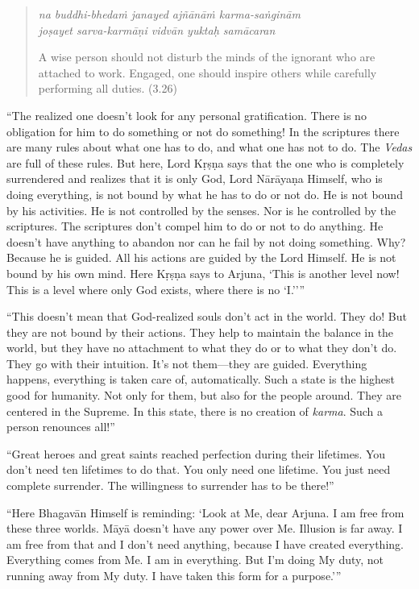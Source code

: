 \documentclass[12pt, twoside, openright]{memoir}
\begin{document}
\par
\begin{verse}
\textit{na buddhi-bhedaṁ janayed ajñānāṁ karma-saṅginām} \\
\textit{joṣayet sarva-karmāṇi vidvān yuktaḥ samācaran}

\noindent A wise person should not disturb the minds of the ignorant who are attached to work. Engaged, one should inspire others while carefully performing all duties. (3.26)
\end{verse}
\par


\enquote{The realized one doesn’t look for any personal gratification. There is no obligation for him to do something or not do something! In the scriptures there are many rules about what one has to do, and what one has not to do. The \textit{Vedas} are full of these rules. But here, Lord Kṛṣṇa says that the one who is completely surrendered and realizes that it is only God, Lord Nārāyaṇa Himself, who is doing everything, is not bound by what he has to do or not do. He is not bound by his activities. He is not controlled by the senses. Nor is he controlled by the scriptures. The scriptures don’t compel him to do or not to do anything. He doesn’t have anything to abandon nor can he fail by not doing something. Why? Because he is guided. All his actions are guided by the Lord Himself. He is not bound by his own mind. Here Kṛṣṇa says to Arjuna, \enquote{This is another level now! This is a level where only God exists, where there is no ‘I.’}}

\enquote{This doesn’t mean that God-realized souls don’t act in the world. They do! But they are not bound by their actions. They help to maintain the balance in the world, but they have no attachment to what they do or to what they don’t do. They go with their intuition. It’s not them---they are guided. Everything happens, everything is taken care of, automatically. Such a state is the highest good for humanity. Not only for them, but also for the people around. They are centered in the Supreme. In this state, there is no creation of \textit{karma}. Such a person renounces all!}


\enquote{Great heroes and great saints reached perfection during their lifetimes. You don’t need ten lifetimes to do that. You only need one lifetime. You just need complete surrender. The willingness to surrender has to be there!}

\enquote{Here Bhagavān Himself is reminding: \enquote{Look at Me, dear Arjuna. I am free from these three worlds. Māyā doesn’t have any power over Me. Illusion is far away. I am free from that and I don’t need anything, because I have created everything. Everything comes from Me. I am in everything. But I’m doing My duty, not running away from My duty. I have taken this form for a purpose.}}
\end{document}
